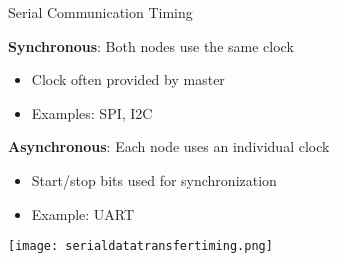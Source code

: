 \begin{concept}{Serial Communication Timing}

    \textbf{Synchronous}: Both nodes use the same clock
    \begin{itemize}
        \item Clock often provided by master
        \item Examples: SPI, I2C
    \end{itemize}
\textbf{Asynchronous}: Each node uses an individual clock
    \begin{itemize}
        \item Start/stop bits used for synchronization
        \item Example: UART
    \end{itemize}
    \texttt{[image: serialdatatransfertiming.png]}
\end{concept}

\multend


